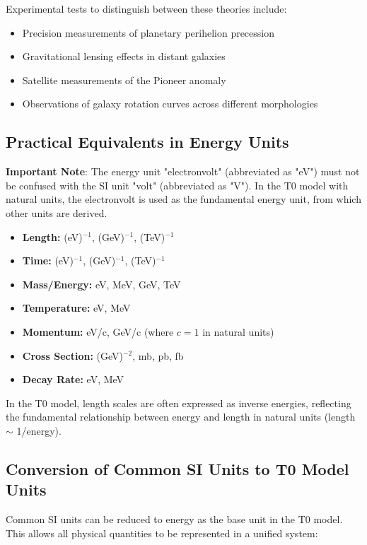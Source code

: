 \documentclass[12pt,a4paper]{article}
\begin{document}
	Experimental tests to distinguish between these theories include:
	\begin{itemize}
		\item Precision measurements of planetary perihelion precession
		\item Gravitational lensing effects in distant galaxies
		\item Satellite measurements of the Pioneer anomaly
		\item Observations of galaxy rotation curves across different morphologies
	\end{itemize}
	
	\subsection*{Practical Equivalents in Energy Units}
	
	\textbf{Important Note}: The energy unit "electronvolt" (abbreviated as "eV") must not be confused with the SI unit "volt" (abbreviated as "V"). In the T0 model with natural units, the electronvolt is used as the fundamental energy unit, from which other units are derived.
	
	\begin{itemize}
		\item \textbf{Length:} (eV)$^{-1}$, (GeV)$^{-1}$, (TeV)$^{-1}$
		\item \textbf{Time:} (eV)$^{-1}$, (GeV)$^{-1}$, (TeV)$^{-1}$
		\item \textbf{Mass/Energy:} eV, MeV, GeV, TeV
		\item \textbf{Temperature:} eV, MeV
		\item \textbf{Momentum:} eV/c, GeV/c (where $c=1$ in natural units)
		\item \textbf{Cross Section:} (GeV)$^{-2}$, mb, pb, fb
		\item \textbf{Decay Rate:} eV, MeV
	\end{itemize}
	
	In the T0 model, length scales are often expressed as inverse energies, reflecting the fundamental relationship between energy and length in natural units (length $\sim$ 1/energy).
	
	\subsection*{Conversion of Common SI Units to T0 Model Units}
	
	Common SI units can be reduced to energy as the base unit in the T0 model. This allows all physical quantities to be represented in a unified system:
	
\end{document}
